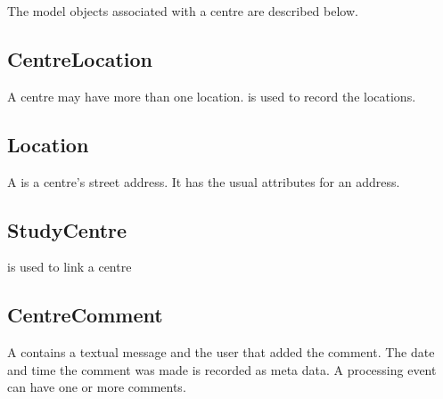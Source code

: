 The model objects associated with a centre are described below.

\subsection*{CentreLocation}
A centre may have more than one location.  is used
to record the locations.

\subsection*{Location}
A  is a centre's street address. It has the usual
attributes for an address.

\subsection*{StudyCentre}
 is used to link a centre

\subsection*{CentreComment}
A  contains a textual message and the
user that added the comment. The date and time the comment was made is recorded
as meta data. A processing event can have one or more comments.

